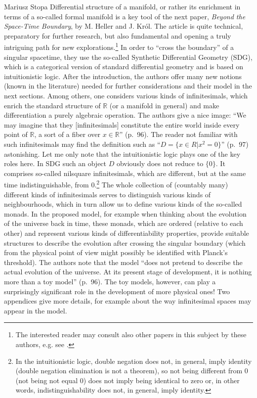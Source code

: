 \begin{recengenv}{Mariusz Stopa}
Differential structure of a manifold, or rather its enrichment in terms of a so-called formal manifold is a key tool of the next paper, \textit{Beyond the Space-Time Boundary}, by M. Heller and J. Król. The article is quite technical, preparatory for further research, but also fundamental and opening a truly intriguing path for new explorations.\footnote{The interested reader may consult also other papers in this subject by these authors, e.g. see \parencite{heller-krol-2016, heller-krol-2017}.} In order to ``cross the boundary'' of a singular spacetime, they use the so-called Synthetic Differential Geometry (SDG), which is a cat\-e\-go\-rical version of standard differential geometry and is based on intuitionistic logic. After the introduction, the authors offer many new notions (known in the literature) needed for further considerations and their model in the next sections. Among others, one considers various kinds of infinitesimals, which enrich the standard structure of $ \mathbb{R} $ (or a manifold in general) and make differentiation a purely algebraic operation. The authors give a nice image: ``We may imagine that they [infinitesimals] constitute the entire world inside every point of $ \mathbb{R} $, a sort of a fiber over $ x\in\mathbb{R} $'' (p.~96). The reader not familiar with such infinitesimals may find the definition such as ``$ D=\{x\in R | x^2=0\} $'' (p.~97) astonishing. Let me only note that the intuitionistic logic plays one of the key roles here. In SDG such an object $ D $ obviously does not reduce to $ \{0\} $. It comprises so-called nilsquare infinitesimals, which are different, but at the same time indistinguishable, from $ 0 $.\footnote{In the intuitionistic logic, double negation does not, in general, imply identity (double negation elimination is not a theorem), so not being different from $ 0 $ (not being not equal $ 0 $) does not imply being identical to zero or, in other words, indistinguishability does not, in general, imply identity.} The whole collection of (countably many) different kinds of infinitesimals serves to distinguish various kinds of neighbourhoods, which in turn allow us to define various kinds of the so-called monads. In the proposed model, for example when thinking about the evolution of the universe back in time, these monads, which are ordered (relative to each other) and represent various kinds of differentiability properties, provide suitable structures to describe the evolution after crossing the singular boundary (which from the physical point of view might possibly be identified with Planck's threshold). The authors note that the model ``does not pretend to describe the actual evolution of the universe. At its present stage of development, it is nothing more than a toy model'' (p.~96). The toy models, however, can play a surprisingly significant role in the development of more physical ones! Two appendices give more details, for example about the way infinitesimal spaces may appear in the model.



\end{recengenv}
